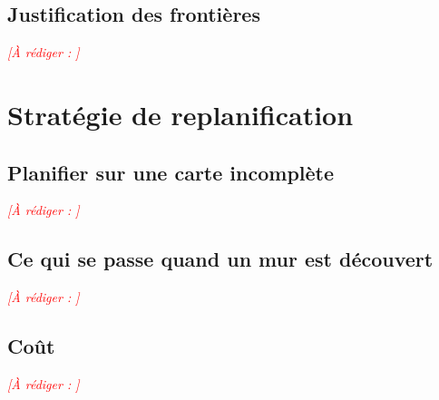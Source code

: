 \documentclass[11pt,a4paper]{article}
\newcommand{\afaire}[1]{\textcolor{red}{\textit{[À rédiger : #1]}}}
\begin{document}
\subsection{Justification des frontières}
\afaire{}

\section{Stratégie de replanification}

\subsection{Planifier sur une carte incomplète}
\afaire{}

\subsection{Ce qui se passe quand un mur est découvert}
\afaire{}

\subsection{Coût}
\afaire{}
\end{document}
